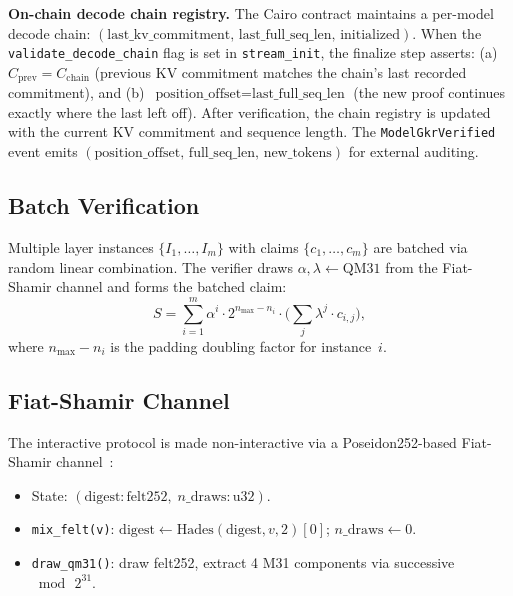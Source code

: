 \documentclass[10pt,twocolumn]{article}
\theoremstyle{definition}
\theoremstyle{remark}
\newcommand{\QM}{\mathrm{QM31}}
\begin{document}
\textbf{On-chain decode chain registry.}
The Cairo contract maintains a per-model decode chain:
$(\text{last\_kv\_commitment},\, \text{last\_full\_seq\_len},\,
\text{initialized})$.
When the \texttt{validate\_decode\_chain} flag is set in
\texttt{stream\_init}, the finalize step asserts:
(a)~$C_{\text{prev}} = C_{\text{chain}}$ (previous KV commitment
matches the chain's last recorded commitment), and
(b)~$\text{position\_offset} = \text{last\_full\_seq\_len}$ (the
new proof continues exactly where the last left off).
After verification, the chain registry is updated with the
current KV commitment and sequence length.
The \texttt{ModelGkrVerified} event emits
$(\text{position\_offset},\, \text{full\_seq\_len},\,
\text{new\_tokens})$ for external auditing.

\subsection{Batch Verification}

Multiple layer instances $\{I_1,\ldots,I_m\}$ with claims
$\{c_1,\ldots,c_m\}$ are batched via random linear combination.
The verifier draws $\alpha,\lambda\leftarrow\QM$ from the Fiat-Shamir
channel and forms the batched claim:
\begin{equation}\label{eq:batch}
  S = \sum_{i=1}^{m} \alpha^i \cdot 2^{n_{\max}-n_i} \cdot
  \biggl(\sum_j \lambda^j \cdot c_{i,j}\biggr),
\end{equation}
where $n_{\max}-n_i$ is the padding doubling factor for instance~$i$.

\subsection{Fiat-Shamir Channel}

The interactive protocol is made non-interactive via a Poseidon252-based
Fiat-Shamir channel~\cite{fiat1986prove}:
\begin{itemize}[nosep,leftmargin=1.2em]
  \item State: $(\text{digest}: \text{felt252},\; n\_\text{draws}: \text{u32})$.
  \item \texttt{mix\_felt(v)}: $\text{digest} \leftarrow
        \text{Hades}(\text{digest}, v, 2)[0]$; $n\_\text{draws}\leftarrow 0$.
  \item \texttt{draw\_qm31()}: draw felt252, extract 4 M31 components
        via successive $\bmod\,2^{31}$.
\end{itemize}


\end{document}
